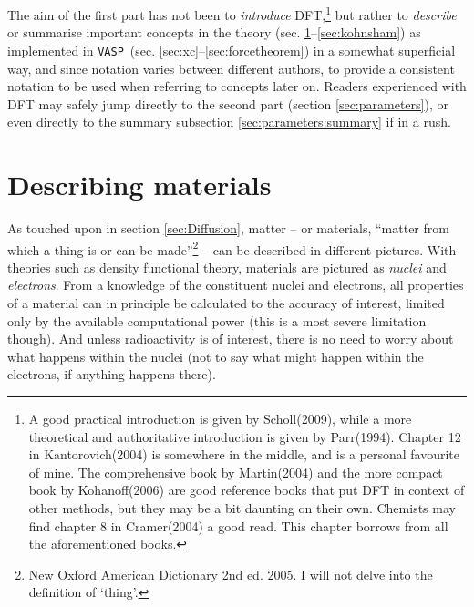 \documentclass[11pt,bibliography=totoc,index=totoc]{scrbook}   %
\newcommand{\vasp}{{\texttt{VASP}}} %
\begin{document}
The aim of the first part has not been to \emph{introduce} DFT,\footnote{
A good practical introduction is given by Scholl(2009)\cite{Scholl:2009}, while a more theoretical and authoritative introduction is given by Parr(1994)\cite{Parr:1994}.
Chapter 12 in Kantorovich(2004)\cite{Kantorovich:2004} is somewhere in the middle, and is a personal favourite of mine.
The comprehensive book by Martin(2004)\cite{Martin:2004} and the more compact book by Kohanoff(2006)\cite{Kohanoff:2006} are good reference books that put DFT in context of other methods, 
but they may be a bit daunting on their own.
Chemists may find chapter 8 in Cramer(2004)\cite{Cramer:2004} a good read.
This chapter borrows from all the aforementioned books.
}
but rather to \emph{describe} or summarise important concepts in the theory (sec. \ref{sec:materials}--\ref{sec:kohnsham}) as implemented in \vasp\ (sec. \ref{sec:xc}--\ref{sec:forcetheorem}) in a somewhat superficial way, 
and since notation varies between different authors, to provide a consistent notation to be used when referring to concepts later on. 
Readers experienced with DFT may safely jump directly to the second part (section \ref{sec:parameters}),
or even directly to the summary subsection \ref{sec:parameters:summary} if in a rush. 



%
\section{Describing materials}\label{sec:materials}
%


As touched upon in section \ref{sec:Diffusion}, matter – or materials, ``matter from which a thing is or can be made''\footnote{New Oxford American Dictionary 2nd ed. 2005. I will not delve into the definition of `thing'.} – can be described in different pictures. 
With theories such as density functional theory, materials are pictured as \emph{nuclei} and \emph{electrons}. %
From a knowledge of the constituent nuclei and electrons, all properties of a material can in principle be calculated to the accuracy of interest, limited only by the available computational power (this is a most severe limitation though).
And unless radioactivity is of interest, there is no need to worry about what happens within the nuclei (not to say what might happen within the electrons, if anything happens there).
\end{document}
